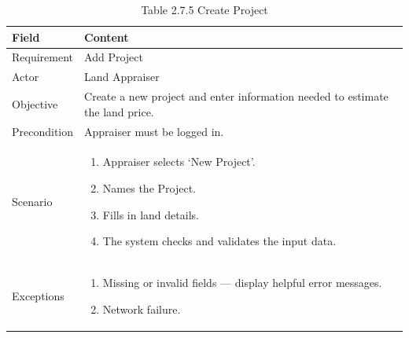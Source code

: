 \documentclass[12pt,oneside]{report}
\begin{document}
\begin{table}[H]
\centering
\caption{Table 2.7.5 Create Project}
\label{tab:req-create-project}
\begin{tabularx}{\textwidth}{|p{3cm}|X|}
\hline
\textbf{Field} & \textbf{Content} \\ \hline

Requirement & Add Project \\ \hline

Actor & Land Appraiser \\ \hline

Objective & Create a new project and enter information needed to estimate the land price. \\ \hline

Precondition & Appraiser must be logged in. \\ \hline

Scenario & 
\begin{minipage}[t]{0.75\textwidth}
\begin{enumerate}[leftmargin=*,label=\arabic*.]
\item Appraiser selects ‘New Project’.
\item Names the Project.
\item Fills in land details.
\item The system checks and validates the input data.
\end{enumerate}
\end{minipage} \\ \hline

Exceptions & 
\begin{minipage}[t]{0.75\textwidth}
\begin{enumerate}[leftmargin=*,label=\arabic*.]
\item Missing or invalid fields — display helpful error messages.
\item Network failure.
\end{enumerate}
\end{minipage} \\ \hline
\end{tabularx}
\end{table}
\end{document}
